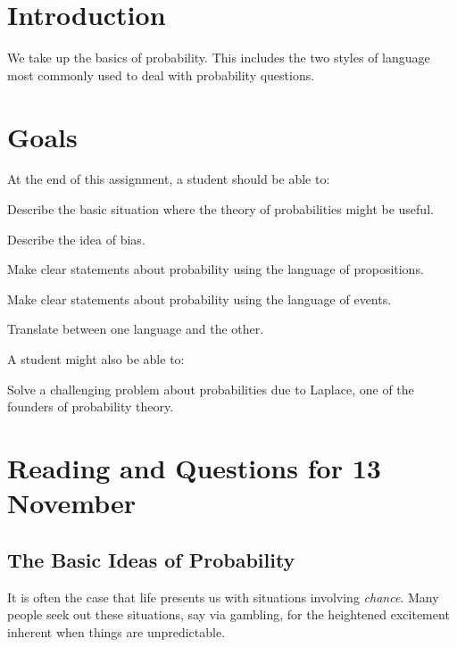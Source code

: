 \documentclass[12pt,letterpaper]{article}
\theoremstyle{definition}
\begin{document}
\setlength{\parskip}{1ex plus 0.5ex minus 0.2ex}
\setlength{\parindent}{0pt}

\pagestyle{fancy}
\cfoot{}

\section*{Introduction}
We take up the basics of probability. This includes the two styles of language most commonly used to deal with probability questions.

\section*{Goals}
At the end of this assignment, a student should be able to:
\begin{compactitem}
\item Describe the basic situation where the theory of probabilities might be useful.
\item Describe the idea of bias.
\item Make clear statements about probability using the language of propositions.
\item Make clear statements about probability using the language of events.
\item Translate between one language and the other.
\end{compactitem}
A student might also be able to:
\begin{compactitem}
\item Solve a challenging problem about probabilities due to Laplace, one of the founders of probability theory.
\end{compactitem}

\section*{Reading and Questions for 13 November}

\subsection*{The Basic Ideas of Probability}

It is often the case that life presents us with situations involving \emph{chance}.
Many people seek out these situations, say via gambling, for the heightened excitement inherent when things are unpredictable.
\end{document}
